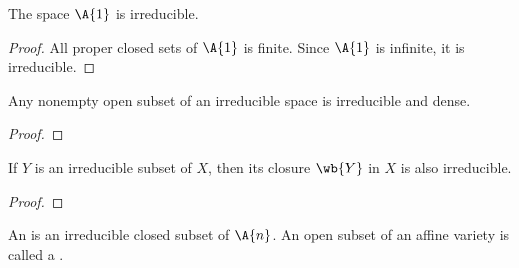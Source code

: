 \documentclass[10pt]{article}
\begin{document}
\begin{example}
    The space $\A{1}$ is irreducible.
\end{example}
\begin{proof}
    All proper closed sets of $\A{1}$ is finite. Since $\A{1}$ is infinite, it is irreducible.
\end{proof}
\begin{example}
    Any nonempty open subset of an irreducible space is irreducible and dense.
\end{example}
\begin{proof}
    
\end{proof}
\begin{example}
    If $Y$ is an irreducible subset of $X$, then its closure $\wb{Y}$ in $X$ is also irreducible.
\end{example}
\begin{proof}
    
\end{proof}
\begin{definition}
    An  is an irreducible closed subset of $\A{n}$. An open subset of an affine variety is called a .
\end{definition}





\hindex
\end{document}
